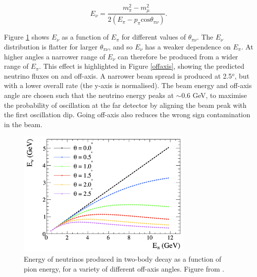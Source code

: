 \begin{equation}
E_{\nu} = \frac{m^{2}_{\pi} - m^{2}_{\mu}}{2(E_{\pi} - p_{\pi} \text{cos}\theta_{\pi\nu})}.
\end{equation}

Figure \ref{offaxisEdep} shows $E_\nu$ as a function of $E_\pi$ for different values of $\theta_{\pi\nu}$. The $E_\nu$ distribution is flatter for larger $\theta_{\pi\nu}$, and so $E_\nu$ has a weaker dependence on $E_\pi$. At higher angles a narrower range of $E_\nu$ can therefore be produced from a wider range of $E_\pi$. This effect is highlighted in Figure \ref{offaxis}, showing the predicted neutrino fluxes on and off-axis. A narrower beam spread is produced at 2.5$^o$, but with a lower overall rate (the y-axis is normalised). The beam energy and off-axis angle are chosen such that the neutrino energy peaks at $\sim$0.6 GeV, to maximise the probability of oscillation at the far detector by aligning the beam peak with the first oscillation dip. Going off-axis also reduces the wrong sign contamination in the beam. 

\begin{figure}[!htbp]
\centering
\includegraphics*[width=0.76\textwidth,clip]{figs/offAxisEnergyDep}
\caption{Energy of neutrinos produced in two-body decay as a function of pion energy, for a variety of different off-axis angles. Figure from \cite{duffy2016antineutrino}.} \label{offaxisEdep}
\end{figure}

